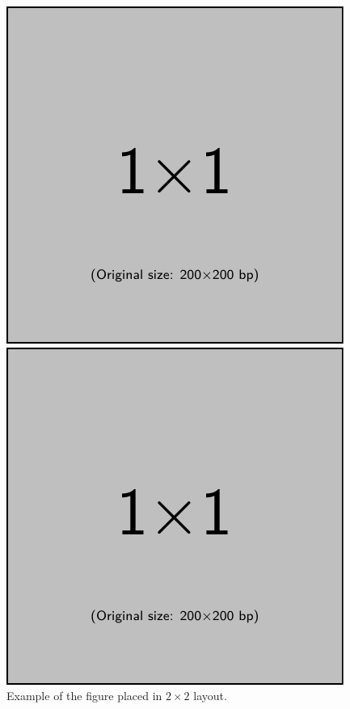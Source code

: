 \documentclass[dvipdfmx,conference,a4paper,nofonttune]{APSIPA}
\begin{document}
\begin{figure}[t]
\begin{minipage}{.45\hsize}
      \centering
      \includegraphics[width=.8\hsize]{figure/example-image-1x1.pdf}
   \end{minipage}
   \begin{minipage}{.45\hsize}
      \centering
      \includegraphics[width=.8\hsize]{figure/example-image-1x1.pdf}
   \end{minipage}
   \caption{Example of the figure placed in $2\times2$ layout.}
\end{figure}
\end{document}
